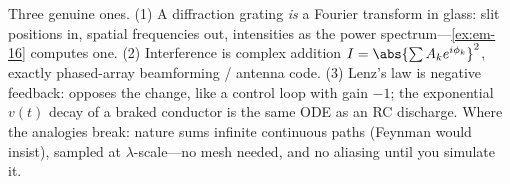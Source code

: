 \begin{remark}\label{rmk:code2}
Three genuine ones. (1) A diffraction grating \emph{is} a Fourier transform in glass: slit positions in, spatial frequencies out, intensities as the power spectrum---\cref{ex:em-16} computes one. (2) Interference is complex addition $I = \abs{\sum A_k e^{i\phi_k}}^2$, exactly phased-array beamforming / antenna code. (3) Lenz's law is negative feedback: opposes the change, like a control loop with gain $-1$; the exponential $v(t)$ decay of a braked conductor is the same ODE as an RC discharge. Where the analogies break: nature sums infinite continuous paths (Feynman would insist), sampled at $\lambda$-scale---no mesh needed, and no aliasing until you simulate it.
\end{remark}
